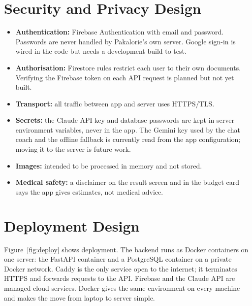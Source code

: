 \section{Security and Privacy Design}\label{sec:security}
\begin{itemize}[noitemsep]
  \item \textbf{Authentication:} Firebase Authentication with email and password. Passwords are never
        handled by Pakalorie's own server. Google sign-in is wired in the code but needs a development
        build to test.
  \item \textbf{Authorisation:} Firestore rules restrict each user to their own documents. Verifying the
        Firebase token on each API request is planned but not yet built.
  \item \textbf{Transport:} all traffic between app and server uses HTTPS/TLS.
  \item \textbf{Secrets:} the Claude API key and database passwords are kept in server environment
        variables, never in the app. The Gemini key used by the chat coach and the offline fallback is
        currently read from the app configuration; moving it to the server is future work.
  \item \textbf{Images:} intended to be processed in memory and not stored.
  \item \textbf{Medical safety:} a disclaimer on the result screen and in the budget card says the app
        gives estimates, not medical advice.
\end{itemize}

\section{Deployment Design}
Figure~\ref{fig:deploy} shows deployment. The backend runs as Docker containers on one server: the FastAPI
container and a PostgreSQL container on a private Docker network. Caddy is the only service open to the
internet; it terminates HTTPS and forwards requests to the API. Firebase and the Claude API are managed cloud
services. Docker gives the same environment on every machine and makes the move from laptop to server simple.

